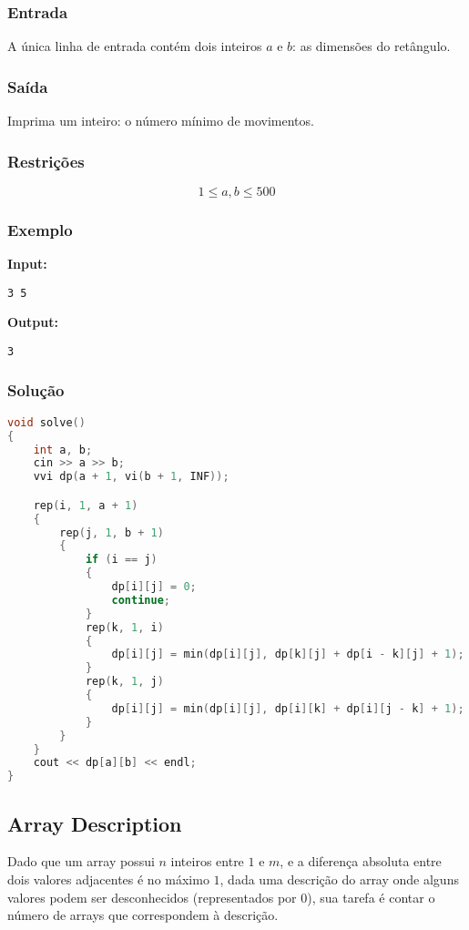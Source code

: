 \subsubsection*{Entrada}
A única linha de entrada contém dois inteiros \( a \) e \( b \): as dimensões do retângulo.

\subsubsection*{Saída}
Imprima um inteiro: o número mínimo de movimentos.

\subsubsection*{Restrições}
\[
1 \le a, b \le 500
\]

\subsubsection*{Exemplo}

\textbf{Input:}
\begin{verbatim}
3 5
\end{verbatim}

\textbf{Output:}
\begin{verbatim}
3
\end{verbatim}

\subsubsection*{Solução}
\begin{lstlisting}[language=C++]
void solve()
{
    int a, b;
    cin >> a >> b;
    vvi dp(a + 1, vi(b + 1, INF));

    rep(i, 1, a + 1)
    {
        rep(j, 1, b + 1)
        {
            if (i == j)
            {
                dp[i][j] = 0;
                continue;
            }
            rep(k, 1, i)
            {
                dp[i][j] = min(dp[i][j], dp[k][j] + dp[i - k][j] + 1);
            }
            rep(k, 1, j)
            {
                dp[i][j] = min(dp[i][j], dp[i][k] + dp[i][j - k] + 1);
            }
        }
    }
    cout << dp[a][b] << endl;
}
\end{lstlisting}

\subsection{Array Description}
Dado que um array possui \( n \) inteiros entre \( 1 \) e \( m \), e a diferença absoluta entre dois valores adjacentes é no máximo \( 1 \), dada uma descrição do array onde alguns valores podem ser desconhecidos (representados por \( 0 \)), sua tarefa é contar o número de arrays que correspondem à descrição.


